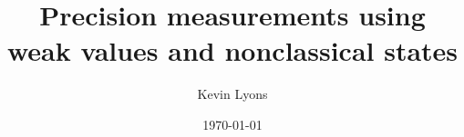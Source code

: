 \documentclass[]{report}
\begin{document}
\title{Precision measurements using weak values and nonclassical states}
\author{Kevin Lyons}
\date{\today}
\maketitle
{}

\tableofcontents
\pagestyle{empty} %









\end{document}
